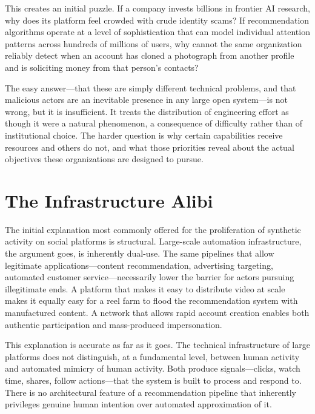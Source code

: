 \documentclass[12pt,a4paper]{article}
\begin{document}
This creates an initial puzzle. If a company invests billions in frontier AI research, why does
its platform feel crowded with crude identity scams? If recommendation algorithms operate at a
level of sophistication that can model individual attention patterns across hundreds of millions
of users, why cannot the same organization reliably detect when an account has cloned a photograph
from another profile and is soliciting money from that person's contacts?

The easy answer---that these are simply different technical problems, and that malicious actors
are an inevitable presence in any large open system---is not wrong, but it is insufficient. It
treats the distribution of engineering effort as though it were a natural phenomenon, a consequence
of difficulty rather than of institutional choice. The harder question is why certain capabilities
receive resources and others do not, and what those priorities reveal about the actual objectives
these organizations are designed to pursue.

\section{The Infrastructure Alibi}

The initial explanation most commonly offered for the proliferation of synthetic activity on social
platforms is structural. Large-scale automation infrastructure, the argument goes, is inherently
dual-use. The same pipelines that allow legitimate applications---content recommendation,
advertising targeting, automated customer service---necessarily lower the barrier for actors
pursuing illegitimate ends. A platform that makes it easy to distribute video at scale makes it
equally easy for a reel farm to flood the recommendation system with manufactured content. A
network that allows rapid account creation enables both authentic participation and mass-produced
impersonation.

This explanation is accurate as far as it goes. The technical infrastructure of large platforms
does not distinguish, at a fundamental level, between human activity and automated mimicry of
human activity. Both produce signals---clicks, watch time, shares, follow actions---that the
system is built to process and respond to. There is no architectural feature of a recommendation
pipeline that inherently privileges genuine human intention over automated approximation of it.
\end{document}
